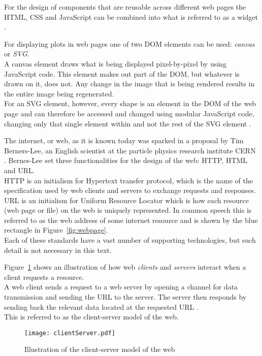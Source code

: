 \documentclass[a4paper,12pt]{article}
\begin{document}
For the design of components that are reusable across different web pages the HTML, CSS and JavaScript can be combined into what is referred to as a widget \citep{snoyman}.

For displaying plots in web pages one of two DOM elements can be used: \emph{canvas} or \emph{SVG}.\\A canvas element draws what is being displayed pixel-by-pixel by using JavaScript code. This element makes out part of the DOM, but whatever is drawn on it, does not. Any change in the image that is being rendered results in the entire image being regenerated.\\For an SVG element, however, every shape is an element in the DOM of the web page and can therefore be accessed and changed using modular JavaScript code, changing only that single element within and not the rest of the SVG element \citep{svgCanvas}.

The internet, or web, as it is known today was sparked in a proposal by Tim Berners-Lee, an English scientist at the particle physics research institute CERN \citep{lubanovic}. Bernes-Lee set three functionalities for the design of the web: HTTP, HTML and URL.\\HTTP is an initialism for Hypertext transfer protocol, which is the name of the specification used by web clients and servers to exchange requests and responses. \\URL is an initialism for Uniform Resource Locator which is how each resource (web page or file) on the web is uniquely represented. In common speech this is referred to as the web address of some internet resource and is shown by the blue rectangle in Figure~\ref{fig:webpage}.\\Each of these standards have a vast number of supporting technologies, but such detail is not necessary in this text.

Figure~\ref{fig:clientServer} shows an illustration of how web \emph{clients} and \emph{servers} interact when a client requests a resource.\\A web client sends a request to a web server by opening a channel for data transmission and sending the URL to the server. The server then responds by sending back the relevant data located at the requested URL \citep{lubanovic}.\\This is referred to as the client-server model of the web.

\begin{figure}[htbp]
  \centering
  \texttt{[image: clientServer.pdf]}
  \caption[Client-server model]{Illustration of the client-server model of the web}
  \label{fig:clientServer}
\end{figure}
\end{document}
